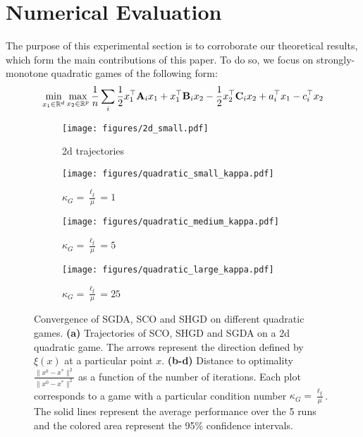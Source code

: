 \documentclass{article}
\begin{document}
\section{Numerical Evaluation}
\label{sec:numerical_eval}
\vspace{-2mm}
The purpose of this experimental section is to corroborate our theoretical results, which form the main contributions of this paper. To do so, we focus on strongly-monotone quadratic games of the following form:
 \vspace{-3mm}
\begin{equation}
  \label{eq:quadratic_games}
      \min_{x_1 \in \mathbb{R}^{d}} \max_{x_2 \in \mathbb{R}^{p}} \frac{1}{n}\sum_i \frac{1}{2} x_1^\top \mathbf{A}_i x_1 + x_1^\top \mathbf{B}_i x_2 - \frac{1}{2} x_2^\top \mathbf{C}_i x_2 + a_i^\top x_1 - c_i^\top x_2
\end{equation}
\begin{figure}[t]
  \centering
  \begin{subfigure}[b]{0.24\textwidth}
  \texttt{[image: figures/2d\_small.pdf]}
  \caption{2d trajectories}
  \label{fig:2d_game}
  \end{subfigure}
  \begin{subfigure}[b]{0.24\textwidth}
    \texttt{[image: figures/quadratic\_small\_kappa.pdf]}
    \caption{$\kappa_G=\frac{\ell_\xi}{\mu}=1$}
      \label{adnsonaoda}
  \end{subfigure}
  \begin{subfigure}[b]{0.24\textwidth}
    \texttt{[image: figures/quadratic\_medium\_kappa.pdf]}
    \caption{$\kappa_G=\frac{\ell_\xi}{\mu}=5$}
  \end{subfigure}
  \begin{subfigure}[b]{0.24\textwidth}
    \texttt{[image: figures/quadratic\_large\_kappa.pdf]}
    \caption{$\kappa_G=\frac{\ell_\xi}{\mu}=25$}
  \end{subfigure}
  \vspace{-2mm}
  \caption{\small Convergence of SGDA, SCO and SHGD on different quadratic games. \textbf{(a)} Trajectories of SCO, SHGD and SGDA on a 2d quadratic game. The arrows represent the direction defined by $\xi(x)$ at a particular point $x$. \textbf{(b-d)} Distance to optimality $\frac{\|x^k-x^*\|^2}{\|x^0-x^*\|^2}$ as a function of the number of iterations. Each plot corresponds to a game with a particular condition number $\kappa_G=\frac{\ell_\xi}{\mu}$. The solid lines represent the average performance over the 5 runs and the colored area represent the 95\% confidence intervals.}
  \label{fig:quadratic_game}
\end{figure}
\end{document}
